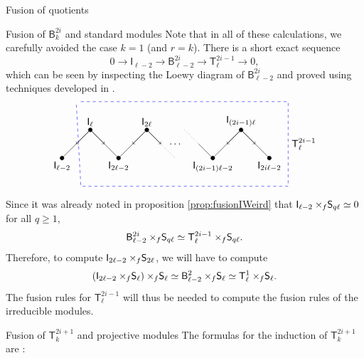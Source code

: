 \documentclass[reqno]{amsart}
\newcommand{\ds}[1]{\mathsf S_{#1}}
\newcommand{\dl}[1]{\mathsf I_{#1}}
\newcommand{\xf}{\times\hspace{-0.27em}_f}
\newcommand{\T}[2]{\mathsf{T}^{#1}_{#2}}
\newcommand{\B}[2]{\mathsf{B}^{#1}_{#2}}
\newcommand{\lc}{\ell}
\begin{document}
\begin{section}{Fusion of quotients}
\begin{subsection}{Fusion of $\B{2i}{k}$ and standard modules}
Note that in all of these calculations, we carefully avoided the case $k=1$ (and $r=k$). There is a short exact sequence
\begin{equation}
0 \longrightarrow \dl{\lc-2} \longrightarrow \B{2i}{\lc-2} \longrightarrow \T{2i -1}{\lc} \longrightarrow 0,
\end{equation}
which can be seen by inspecting the Loewy diagram of $\B{2i}{\lc-2}$ and proved using techniques developed in \cite{BelRiSy}.
\begin{equation}
\begin{tikzpicture}[scale=1/3]
\filldraw	
	   (0,0) circle (6 pt) node[anchor = north] {$\dl{\lc-2}$}
 	-- (3,3) circle (6 pt) node[anchor = south] {$\dl{\lc}$}
 	-- (6,0) circle (6 pt) node[anchor = north] {$\dl{2\lc-2}$}
	-- (9,3) circle (6 pt) node[anchor = south] {$\dl{2\lc}$};
\draw (9,3) -- (10.5,1.5);
\draw[dotted] (10.5,1.5) -- (12,0);
\node at (12,1.5) {$\hdots$};
\draw[dotted] (13,3) -- (14.5,1.5);
\draw (14.5,1.5) -- (16,0);
\filldraw
	   (16,0) circle (6 pt) node[anchor = north] {$\dl{(2i-1)\lc-2}$}
	-- (19,3) circle (6 pt) node[anchor = south] {$\dl{(2i-1)\lc}$}
	-- (22,0) circle (6 pt) node[anchor = north] {$\dl{2i\lc -2}$};
\draw[->] (3,3) -- (1.5,1.5);
\draw[->] (3,3) -- (4.5,1.5);
\draw[->] (9,3) -- (7.5,1.5);
\draw[->] (9,3) -- (10.5,1.5);
\draw[->] (19,3) -- (17.5,1.5);
\draw[->] (19,3) -- (20.5,1.5);
\draw[dashed,blue]
		(2,6) -- (24,6)
	--  (24,-3) -- (2,-3)
	--	(1.5,6);
\node[anchor = west]  at (24,1.5) {$\T{2i-1}{\lc}$};
\end{tikzpicture}
\end{equation}
Since it was already noted in proposition \ref{prop:fusionIWeird} that $\dl{\lc-2} \xf \ds{q\lc} \simeq 0$ for all $q\geq 1$, 
\begin{equation}\label{eq:fusionBSWeird}
\B{2i}{\lc-2}\xf \ds{q\lc} \simeq \T{2i -1}{\lc} \xf \ds{q\lc}.
\end{equation}
Therefore, to compute $\dl{2\lc-2} \xf \ds{2\lc}$, we will have to compute
\begin{equation}
\left(\dl{2\lc-2} \xf \ds{\lc}\right) \xf \ds{\lc} \simeq \B{2}{\lc-2} \xf \ds{\lc} \simeq \T{1}{\lc} \xf \ds{\lc}.
\end{equation}
The fusion rules for $\T{2i-1}{\lc}$ will thus be needed to compute the fusion rules of the irreducible modules.
\end{subsection}
\begin{subsection}{Fusion of $\T{2i+1}{k}$ and projective modules}\label{sec:fusionTvsP}
The formulas for the induction of $\T{2i+1}{k}$ are \cite{BelRiSy}:

\end{subsection}
\end{section}
\end{document}
